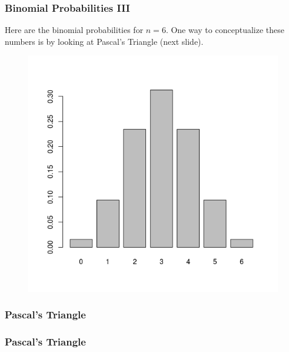 \documentclass[xcolor=dvipsnames]{beamer}
\begin{document}
\begin{frame}
  \frametitle{Binomial Probabilities III}
Here are the binomial probabilities for $n=6$. One way to
conceptualize these numbers is by looking at Pascal's Triangle (next
slide). 
  \begin{figure}[h]
    \includegraphics[scale=.5]{./diagrams/binomial1.png}
  \end{figure}
\end{frame}

\begin{frame}
  \frametitle{Pascal's Triangle}
\end{frame}

\begin{frame}
  \frametitle{Pascal's Triangle}
\end{frame}
\end{document}
